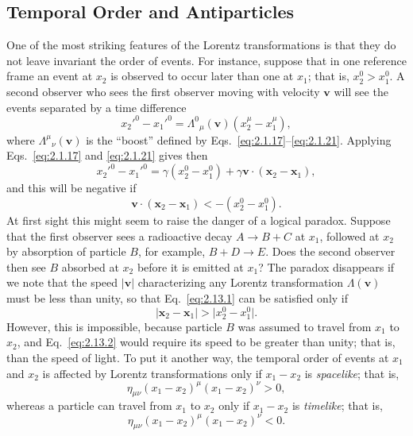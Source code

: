 
\subsection{Temporal Order and Antiparticles\optionalreading}
\label{sec:2.13}
\begingroup
\renewcommand\thefootnote{*}
\endgroup

One of the most striking features of the Lorentz transformations is that they
do not leave invariant the order of events. For instance, suppose that in one
reference frame an event at \(x_2\) is observed to occur later than one at
\(x_1\); that is, \(x_2^0>x_1^0\). A second observer who sees the first
observer moving with velocity \(\mathbf v\) will see the events separated by a
time difference
\[
  x_2'^0-x_1'^0
  =\Lambda^0{}_\mu(\mathbf v)(x_2^\mu-x_1^\mu),
\]
where \(\Lambda^\mu{}_\nu(\mathbf v)\) is the ``boost'' defined by
Eqs.~\eqref{eq:2.1.17}--\eqref{eq:2.1.21}. Applying
Eqs.~\eqref{eq:2.1.17} and \eqref{eq:2.1.21} gives then
\[
  x_2'^0-x_1'^0
  =\gamma(x_2^0-x_1^0)
   +\gamma\mathbf v\cdot(\mathbf x_2-\mathbf x_1),
\]
and this will be negative if
\begin{equation}
  \mathbf v\cdot(\mathbf x_2-\mathbf x_1)
  <-(x_2^0-x_1^0).
  \tag{2.13.1}\label{eq:2.13.1}
\end{equation}
At first sight this might seem to raise the danger of a logical paradox.
Suppose that the first observer sees a radioactive decay
\(A\to B+C\) at \(x_1\), followed at \(x_2\) by absorption of particle
\(B\), for example, \(B+D\to E\). Does the second observer then see \(B\)
absorbed at \(x_2\) before it is emitted at \(x_1\)? The paradox disappears if
we note that the speed \(\lvert\mathbf v\rvert\) characterizing any Lorentz
transformation \(\Lambda(\mathbf v)\) must be less than unity, so that
Eq.~\eqref{eq:2.13.1} can be satisfied only if
\begin{equation}
  \lvert\mathbf x_2-\mathbf x_1\rvert
  >\lvert x_2^0-x_1^0\rvert .
  \tag{2.13.2}\label{eq:2.13.2}
\end{equation}
However, this is impossible, because particle \(B\) was assumed to travel from
\(x_1\) to \(x_2\), and Eq.~\eqref{eq:2.13.2} would require its speed to be
greater than unity; that is, than the speed of light. To put it another way,
the temporal order of events at \(x_1\) and \(x_2\) is affected by Lorentz
transformations only if \(x_1-x_2\) is \emph{spacelike}; that is,
\[
  \eta_{\mu\nu}(x_1-x_2)^\mu(x_1-x_2)^\nu>0,
\]
whereas a particle can travel from \(x_1\) to \(x_2\) only if \(x_1-x_2\) is
\emph{timelike}; that is,
\[
  \eta_{\mu\nu}(x_1-x_2)^\mu(x_1-x_2)^\nu<0 .
\]

